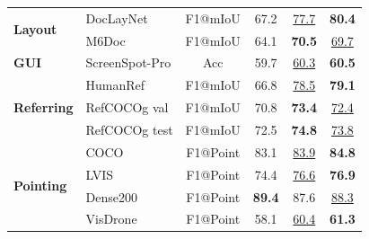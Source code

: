 \begin{table}[!t]
{\begin{tabular}{ll c | c | c | c}
            \multirow{2}{*}{\textbf{Layout}} 
            & DocLayNet & F1@mIoU & 67.2 & \underline{77.7} & \textbf{80.4} \\
            & M6Doc & F1@mIoU & 64.1 & \textbf{70.5} & \underline{69.7} \\
            \midrule

            \textbf{GUI} 
            & ScreenSpot-Pro & Acc & 59.7 & \underline{60.3} & \textbf{60.5} \\
            \midrule

            \multirow{3}{*}{\textbf{Referring}} 
            & HumanRef & F1@mIoU & 66.8 & \underline{78.5} & \textbf{79.1} \\
            & RefCOCOg val & F1@mIoU & 70.8 & \textbf{73.4} & \underline{72.4} \\
            & RefCOCOg test & F1@mIoU & 72.5 & \textbf{74.8} & \underline{73.8} \\
            \midrule
            
            
            \multirow{4}{*}{\textbf{Pointing}} 
            & COCO & F1@Point & 83.1 & \underline{83.9} & \textbf{84.8} \\
            & LVIS & F1@Point & 74.4 & \underline{76.6} & \textbf{76.9} \\
            & Dense200 & F1@Point & \textbf{89.4} & 87.6 & \underline{88.3} \\
            & VisDrone & F1@Point & 58.1 & \underline{60.4} & \textbf{61.3} \\

            \bottomrule
        \end{tabular}
    }
\vspace{-2mm}
\end{table}